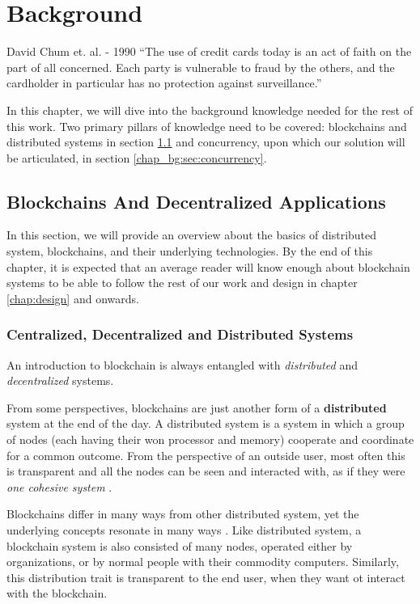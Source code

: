 \chapter{Background} \label{chap:background}

\begin{chapquote}{David Chum et. al. - 1990}
``The use of credit cards today is an act of faith on the part of all concerned. Each party is
vulnerable to fraud by the others, and the cardholder in particular has no protection against
surveillance.''
\end{chapquote}


In this chapter, we will dive into the background knowledge needed for the rest of this work. Two
primary pillars of knowledge need to be covered: blockchains and distributed systems in section
\ref{chap_bg:sec:blockchains} and concurrency, upon which our solution will be articulated, in
section \ref{chap_bg:sec:concurrency}.

\section{Blockchains And Decentralized Applications} \label{chap_bg:sec:blockchains}

In this section, we will provide an overview about the basics of distributed system, blockchains,
and their underlying technologies. By the end of this chapter, it is expected that an average reader
will know enough about blockchain systems to be able to follow the rest of our work and design in
chapter \ref{chap:design} and onwards.

\subsection{Centralized, Decentralized and Distributed Systems}

An introduction to blockchain is always entangled with \textit{distributed} and
\textit{decentralized} systems.

From some perspectives, blockchains are just another form of a \textbf{distributed} system at the
end of the day. A distributed system is a system in which a group of nodes (each having their won
processor and memory) cooperate and coordinate for a common outcome. From the perspective of an
outside user, most often this is transparent and all the nodes can be seen and interacted with, as
if they were \textit{one cohesive system} \cite{mastering_blockchain}.

Blockchains differ in many ways from other distributed system, yet the underlying concepts resonate
in many ways \cite{Herlihy_2019}. Like distributed system, a blockchain system is also consisted of
many nodes, operated either by organizations, or by normal people with their commodity computers.
Similarly, this distribution trait is transparent to the end user, when they want ot interact with
the blockchain.

